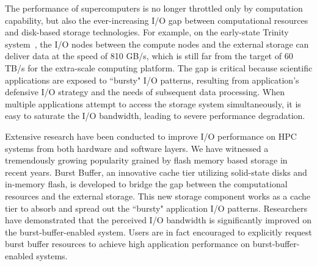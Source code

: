 The performance of supercomputers is no longer throttled only by computation capability,
but also the ever-increasing I/O gap
between computational resources and disk-based storage technologies.
For example, on the early-state Trinity system~\cite{TrinitySystem}, the I/O nodes between
the compute nodes and the external storage can deliver data at  the speed of 810 GB/s,
which is still far from the target of 60 TB/s for the extra-scale computing platform\cite{Shalf:HPCCS:2010}.
The gap is critical because scientific applications are exposed to
``bursty" I/O patterns\cite{Carns:MSST:2011, Kim:PDSW:2010},
resulting from application's
defensive I/O strategy\cite{Latham:CSD:2012, Naik:ICPPW:2009, Dennis:CUG:2009}
and the needs of subsequent data processing.
When multiple applications attempt to access the storage system simultaneously, it is easy to saturate
the I/O bandwidth, leading to severe performance degradation.


Extensive research have been conducted to improve I/O performance on HPC systems from
both hardware and software layers.
We have witnessed a tremendously growing popularity grained by flash memory based storage in recent years.
Burst Buffer, an innovative cache tier utilizing solid-state disks and in-memory flash, 
is developed to bridge the gap between the computational resources and the external storage.
This new storage component works as a cache tier to absorb and spread out
the ``bursty" application I/O patterns\cite{Bent:HBP:2011, Grider:EXA:2010}.
Researchers\cite{Liu:MSST:2012} have demonstrated that the perceived I/O
bandwidth is significantly improved on the burst-buffer-enabled system.
Users are in fact encouraged to explicitly request burst buffer resources to achieve
high application performance on burst-buffer-enabled systems\cite{apex-workflow}.

